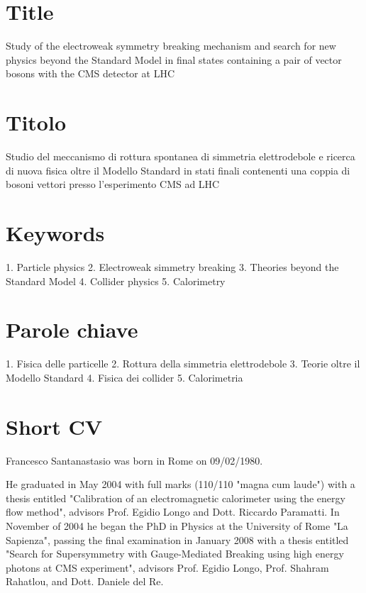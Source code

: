 \documentclass[10pt, a4paper]{article}
\begin{document}
\reversemarginpar

\section*{Title}
Study of the electroweak symmetry breaking mechanism and search 
for new physics beyond the Standard Model in final states containing a pair of 
vector bosons with the CMS detector at LHC

\section*{Titolo}
Studio del meccanismo di rottura spontanea di simmetria elettrodebole e
ricerca di nuova fisica oltre il Modello Standard in stati finali contenenti una coppia
di bosoni vettori presso l'esperimento CMS ad LHC

\section*{Keywords}
1. Particle physics
2. Electroweak simmetry breaking
3. Theories beyond the Standard Model
4. Collider physics
5. Calorimetry

\section*{Parole chiave}
1. Fisica delle particelle
2. Rottura della simmetria elettrodebole
3. Teorie oltre il Modello Standard
4. Fisica dei collider
5. Calorimetria


\section*{Short CV}

Francesco Santanastasio was born in Rome on 09/02/1980. 

He graduated in May 2004 with full marks (110/110 "magna cum laude") with a thesis entitled "Calibration of an electromagnetic calorimeter using the energy flow method", advisors Prof. Egidio Longo and Dott. Riccardo Paramatti. In November of 2004 he began the PhD in Physics at the University of Rome "La Sapienza", passing the final examination in January 2008 with a thesis entitled "Search for Supersymmetry with Gauge-Mediated Breaking using high energy photons at CMS experiment", advisors Prof. Egidio Longo, Prof. Shahram Rahatlou, and Dott. Daniele del Re. 
\end{document}
